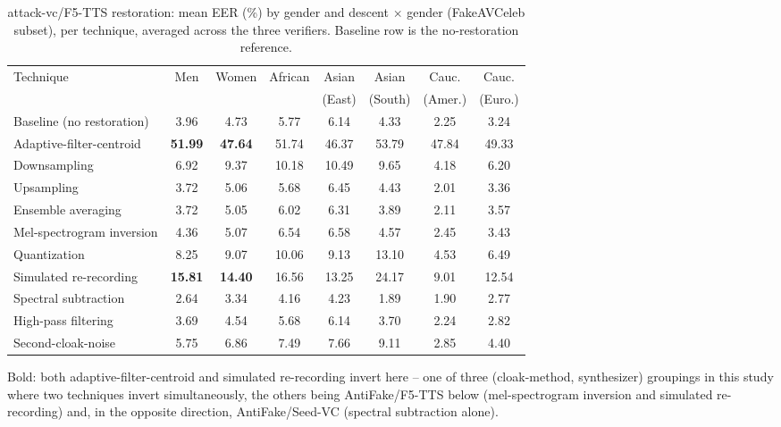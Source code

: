 \documentclass[11pt]{article}
\begin{document}
\begin{table}[H]
\centering
\caption{attack-vc/F5-TTS restoration: mean EER (\%) by gender and
descent $\times$ gender (FakeAVCeleb subset), per technique, averaged
across the three verifiers. Baseline row is the no-restoration
reference.}
\label{tab:restoration-attackvc-f5tts-demo}
\begin{tabular}{lccccccc}
\toprule
Technique & Men & Women & African & Asian & Asian & Cauc. & Cauc. \\
 & & & & (East) & (South) & (Amer.) & (Euro.) \\
\midrule
Baseline (no restoration) & 3.96 & 4.73 & 5.77 & 6.14 & 4.33 & 2.25 & 3.24 \\
Adaptive-filter-centroid & \textbf{51.99} & \textbf{47.64} & 51.74 & 46.37 & 53.79 & 47.84 & 49.33 \\
Downsampling & 6.92 & 9.37 & 10.18 & 10.49 & 9.65 & 4.18 & 6.20 \\
Upsampling & 3.72 & 5.06 & 5.68 & 6.45 & 4.43 & 2.01 & 3.36 \\
Ensemble averaging & 3.72 & 5.05 & 6.02 & 6.31 & 3.89 & 2.11 & 3.57 \\
Mel-spectrogram inversion & 4.36 & 5.07 & 6.54 & 6.58 & 4.57 & 2.45 & 3.43 \\
Quantization & 8.25 & 9.07 & 10.06 & 9.13 & 13.10 & 4.53 & 6.49 \\
Simulated re-recording & \textbf{15.81} & \textbf{14.40} & 16.56 & 13.25 & 24.17 & 9.01 & 12.54 \\
Spectral subtraction & 2.64 & 3.34 & 4.16 & 4.23 & 1.89 & 1.90 & 2.77 \\
High-pass filtering & 3.69 & 4.54 & 5.68 & 6.14 & 3.70 & 2.24 & 2.82 \\
Second-cloak-noise & 5.75 & 6.86 & 7.49 & 7.66 & 9.11 & 2.85 & 4.40 \\
\bottomrule
\end{tabular}

{\small Bold: both adaptive-filter-centroid and simulated re-recording
invert here -- one of three (cloak-method, synthesizer) groupings in
this study where two techniques invert simultaneously, the others being
AntiFake/F5-TTS below (mel-spectrogram inversion and simulated
re-recording) and, in the opposite direction, AntiFake/Seed-VC
(spectral subtraction alone).}
\end{table}
\end{document}
